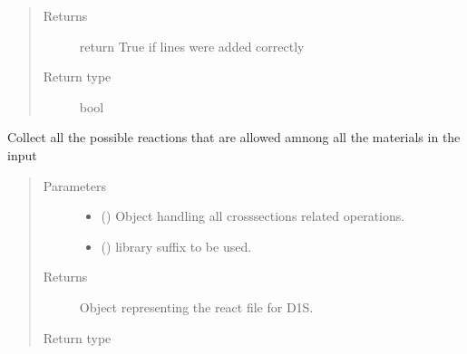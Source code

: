 \documentclass[letterpaper,10pt,english]{sphinxmanual}
\begin{document}
\begin{fulllineitems}
\begin{fulllineitems}
\begin{quote}
\begin{description}
\item[{Returns}] \leavevmode
return True if lines were added correctly

\item[{Return type}] \leavevmode
bool

\end{description}\end{quote}

\end{fulllineitems}


\begin{fulllineitems}
\label{\detokenize{api/inputgeneration:inputfile.D1S_Input.get_reaction_file}}
Collect all the possible reactions that are allowed amnong all the
materials in the input
\begin{quote}\begin{description}
\item[{Parameters}] \leavevmode\begin{itemize}
\item {} 
 ({\hyperref[\detokenize{api/initobjects:libmanager.LibManager}]{}}) \textendash{} Object handling all cross\sphinxhyphen{}sections related operations.

\item {} 
 () \textendash{} library suffix to be used.

\end{itemize}

\item[{Returns}] \leavevmode
Object representing the react file for D1S.

\item[{Return type}] \leavevmode
{\hyperref[\detokenize{api/inputgeneration:parsersD1S.ReactionFile}]{}}

\end{description}\end{quote}

\end{fulllineitems}


\end{fulllineitems}
\end{document}
